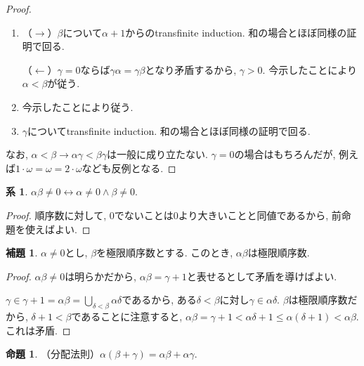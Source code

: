 \documentclass[a4paper, twoside]{bxjsarticle}
\theoremstyle{definition}
\newtheorem{prop}[thm]{命題}
\newtheorem{lem}[thm]{補題}
\newtheorem{cor}[thm]{系}
\begin{document}
        \begin{proof}
            \begin{enumerate}
                \item （$\rightarrow$）$\beta$について$\alpha+1$からのtransfinite induction. 和の場合とほぼ同様の証明で回る.
                
                （$\leftarrow$）$\gamma=0$ならば$\gamma\alpha=\gamma\beta$となり矛盾するから, $\gamma>0$. 今示したことにより$\alpha<\beta$が従う.
                \item 今示したことにより従う.
                \item $\gamma$についてtransfinite induction. 和の場合とほぼ同様の証明で回る.
            \end{enumerate}
            なお, $\alpha<\beta \to \alpha\gamma<\beta\gamma$は一般に成り立たない. $\gamma=0$の場合はもちろんだが, 例えば$1\cdot\omega = \omega = 2\cdot\omega$なども反例となる.
        \end{proof}
        \begin{cor}
            $\alpha\beta\neq0\leftrightarrow\alpha\neq0\land\beta\neq0$.
        \end{cor}
        \begin{proof}
            順序数に対して, 0でないことは0より大きいことと同値であるから, 前命題を使えばよい.
        \end{proof}
        \begin{lem}\label{multwithlimislim}
            $\alpha\neq0$とし, $\beta$を極限順序数とする. このとき, $\alpha\beta$は極限順序数.
        \end{lem}
        \begin{proof}
            $\alpha\beta\neq0$は明らかだから, $\alpha\beta=\gamma+1$と表せるとして矛盾を導けばよい.
            
            $\gamma\in\gamma+1=\alpha\beta=\bigcup_{\delta<\beta}\alpha\delta$であるから, ある$\delta<\beta$に対し$\gamma\in\alpha\delta$. $\beta$は極限順序数だから, $\delta+1<\beta$であることに注意すると, $\alpha\beta=\gamma+1<\alpha\delta+1\leq\alpha(\delta+1)<\alpha\beta$. これは矛盾.
        \end{proof}
        \begin{prop}
            （分配法則）$\alpha(\beta+\gamma)=\alpha\beta+\alpha\gamma$.
        \end{prop}
\end{document}
